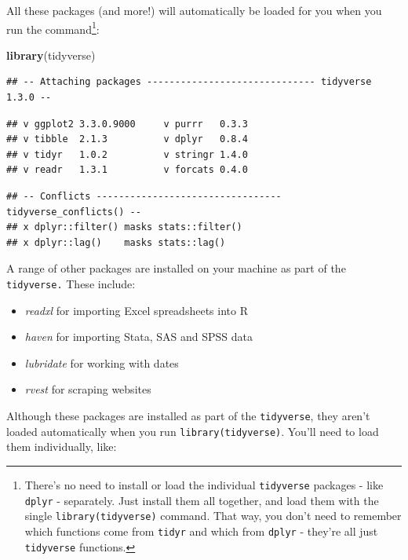 \documentclass[]{book}
\newenvironment{Shaded}{\begin{snugshade}}{\end{snugshade}}
\newcommand{\KeywordTok}[1]{\textcolor[rgb]{0.13,0.29,0.53}{\textbf{#1}}}
\newcommand{\NormalTok}[1]{#1}
\providecommand{\tightlist}{%
  \setlength{\itemsep}{0pt}\setlength{\parskip}{0pt}}
\begin{document}
All these packages (and more!) will automatically be loaded for you when you run the command\footnote{There's no need to install or load the individual \texttt{tidyverse} packages - like \texttt{dplyr} - separately. Just install them all together, and load them with the single \texttt{library(tidyverse)} command. That way, you don't need to remember which functions come from \texttt{tidyr} and which from \texttt{dplyr} - they're all just \texttt{tidyverse} functions.}:

\begin{Shaded}
\begin{Highlighting}[]
\KeywordTok{library}\NormalTok{(tidyverse)}
\end{Highlighting}
\end{Shaded}

\begin{verbatim}
## -- Attaching packages ------------------------------ tidyverse 1.3.0 --
\end{verbatim}

\begin{verbatim}
## v ggplot2 3.3.0.9000     v purrr   0.3.3     
## v tibble  2.1.3          v dplyr   0.8.4     
## v tidyr   1.0.2          v stringr 1.4.0     
## v readr   1.3.1          v forcats 0.4.0
\end{verbatim}

\begin{verbatim}
## -- Conflicts --------------------------------- tidyverse_conflicts() --
## x dplyr::filter() masks stats::filter()
## x dplyr::lag()    masks stats::lag()
\end{verbatim}

A range of other packages are installed on your machine as part of the \texttt{tidyverse.} These include:

\begin{itemize}
\tightlist
\item
  \emph{readxl} for importing Excel spreadsheets into R
\item
  \emph{haven} for importing Stata, SAS and SPSS data
\item
  \emph{lubridate} for working with dates
\item
  \emph{rvest} for scraping websites
\end{itemize}

Although these packages are installed as part of the \texttt{tidyverse}, they aren't loaded automatically when you run \texttt{library(tidyverse)}. You'll need to load them individually, like:
\end{document}
